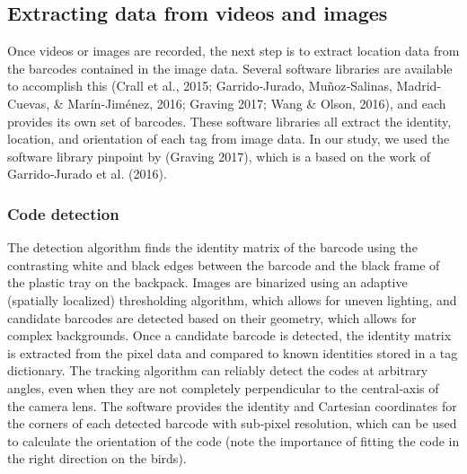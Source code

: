 \documentclass[11pt,a4paper,twoside]{book}
\begin{document}
\begin{doublespace}
\subsection{Extracting data from videos and images}
Once videos or images are recorded, the next step is to extract location data from the barcodes contained in the image data. Several software libraries are available to accomplish this (Crall et al., 2015; Garrido‐Jurado, Muñoz‐Salinas, Madrid‐Cuevas, \& Marín‐Jiménez, 2016; Graving 2017; Wang & Olson, 2016), and each provides its own set of barcodes. These software libraries all extract the identity, location, and orientation of each tag from image data. In our study, we used the software library pinpoint by (Graving 2017), which is a based on the work of Garrido‐Jurado et al. (2016).

\subsubsection{Code detection}
The detection algorithm finds the identity matrix of the barcode using the contrasting white and black edges between the barcode and the black frame of the plastic tray on the backpack. Images are binarized using an adaptive (spatially localized) thresholding algorithm, which allows for uneven lighting, and candidate barcodes are detected based on their geometry, which allows for complex backgrounds. Once a candidate barcode is detected, the identity matrix is extracted from the pixel data and compared to known identities stored in a tag dictionary. The tracking algorithm can reliably detect the codes at arbitrary angles, even when they are not completely perpendicular to the central‐axis of the camera lens. The software provides the identity and Cartesian coordinates for the corners of each detected barcode with sub‐pixel resolution, which can be used to calculate the orientation of the code (note the importance of fitting the code in the right direction on the birds).


\end{doublespace}
\end{document}
